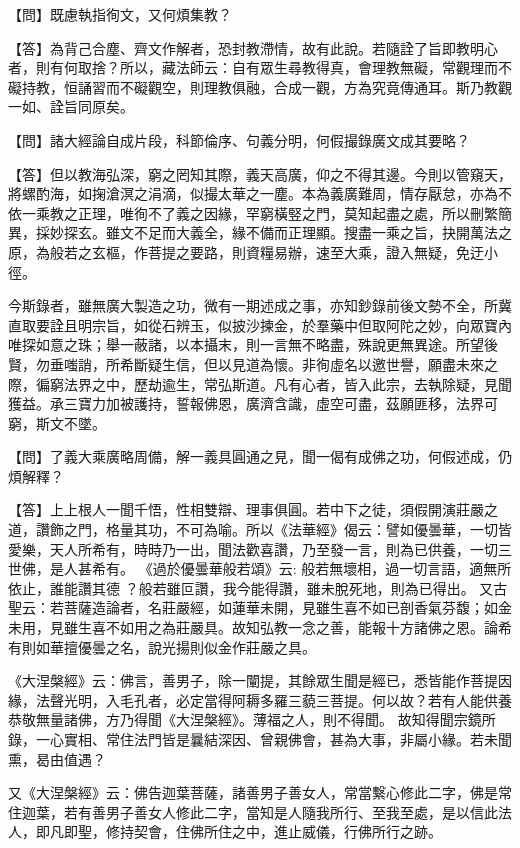 {\heiti 【問】既慮執指徇文，又何煩集教？}

【答】為背己合塵、齊文作解者，恐封教滯情，故有此說。若隨詮了旨即教明心者，則有何取捨？所以，藏法師云：{\kaishu 自有眾生尋教得真，會理教無礙，常觀理而不礙持教，恒誦習而不礙觀空，則理教俱融，合成一觀，方為究竟傳通耳。斯乃教觀一如、詮旨同原矣。}

{\heiti  【問】諸大經論自成片段，科節倫序、句義分明，何假撮錄廣文成其要略？}

【答】但以教海弘深，窮之罔知其際，義天高廣，仰之不得其邊。今則以管窺天，將螺酌海，如掬滄溟之涓滴，似撮太華之一塵。本為義廣難周，情存厭怠，亦為不依一乘教之正理，唯徇不了義之因緣，罕窮橫竪之門，莫知起盡之處，所以刪繁簡異，採妙探玄。雖文不足而大義全，緣不備而正理顯。搜盡一乘之旨，抉開萬法之原，為般若之玄樞，作菩提之要路，則資糧易辦，速至大乘，證入無疑，免迂小徑。


今斯錄者，雖無廣大製造之功，微有一期述成之事，亦知鈔錄前後文勢不全，所冀直取要詮且明宗旨，如從石辨玉，似披沙揀金，於羣藥中但取阿陀之妙，向眾寶內唯探如意之珠；舉一蔽諸，以本攝末，則一言無不略盡，殊說更無異途。所望後賢，勿垂嗤誚，所希斷疑生信，但以見道為懷。非徇虛名以邀世譽，願盡未來之際，徧窮法界之中，歷劫逾生，常弘斯道。凡有心者，皆入此宗，去執除疑，見聞獲益。承三寶力加被護持，誓報佛恩，廣濟含識，虛空可盡，茲願匪移，法界可窮，斯文不墜。

{\heiti【問】了義大乘廣略周備，解一義具圓通之見，聞一偈有成佛之功，何假述成，仍煩解釋？ }

【答】上上根人一聞千悟，性相雙辯、理事俱圓。若中下之徒，須假開演莊嚴之道，讚飾之門，格量其功，不可為喻。所以《法華經》偈云：{\kaishu 譬如優曇華，一切皆愛樂，天人所希有，時時乃一出，聞法歡喜讚，乃至發一言，則為已供養，一切三世佛，是人甚希有。} 《過於優曇華般若頌》云: {\kaishu 般若無壞相，過一切言語，適無所依止，誰能讚其德
？般若雖叵讚，我今能得讚，雖未脫死地，則為已得出}。 又古聖云：{\kaishu 若菩薩造論者，名莊嚴經，如蓮華未開，見雖生喜不如已剖香氣芬馥；如金未用，見雖生喜不如用之為莊嚴具。故知弘教一念之善，能報十方諸佛之恩。論希有則如華擅優曇之名，說光揚則似金作莊嚴之具。}

《大涅槃經》云：{\kaishu 佛言，善男子，除一闡提，其餘眾生聞是經已，悉皆能作菩提因緣，法聲光明，入毛孔者，必定當得阿耨多羅三藐三菩提。何以故？若有人能供養恭敬無量諸佛，方乃得聞《大涅槃經》。薄福之人，則不得聞。} 故知得聞宗鏡所錄，一心實相、常住法門皆是曩結深因、曾親佛會，甚為大事，非屬小緣。若未聞熏，曷由值遇？

又《大涅槃經》云：{\kaishu 佛告迦葉菩薩，諸善男子善女人，常當繫心修此二字，佛是常住迦葉，若有善男子善女人修此二字，當知是人隨我所行、至我至處，是以信此法人，即凡即聖，修持契會，住佛所住之中，進止威儀，行佛所行之跡。}

